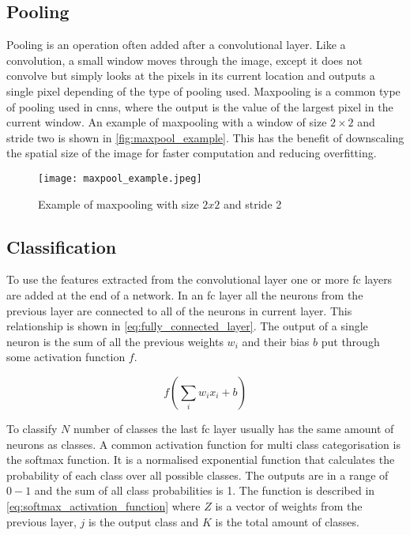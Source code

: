 \subsection{Pooling}
Pooling is an operation often added after a convolutional layer. Like a convolution, a small window moves through the image, except it does not convolve but simply looks at the pixels in its current location and outputs a single pixel depending of the type of pooling used. Maxpooling is a common type of pooling used in \gls{cnn}s, where the output is the value of the largest pixel in the current window. An example of maxpooling with a window of size $2\times2$ and stride two is shown in \autoref{fig:maxpool_example}. This has the benefit of downscaling the spatial size of the image for faster computation and reducing overfitting.

\begin{figure}[H]
\centering
\texttt{[image: maxpool\_example.jpeg]}
\caption{Example of maxpooling with size $2x2$ and stride 2 \citep{Karpathy2016a}}
\label{fig:maxpool_example}
\end{figure}

\subsection{Classification}
To use the features extracted from the convolutional layer one or more \gls{fc} layers are added at the end of a network. In an \gls{fc} layer all the neurons from the previous layer are connected to all of the neurons in current layer. This relationship is shown in \autoref{eq:fully_connected_layer}. The output of a single neuron is the sum of all the previous weights $w_i$ and their bias $b$ put through some activation function $f$.

\begin{equation}
\label{eq:fully_connected_layer}
f\left(\sum_{i}w_{i}x_{i}+b\right)
\end{equation}

To classify $N$ number of classes the last \gls{fc} layer usually has the same amount of neurons as classes. A common activation function for multi class categorisation is the softmax function. It is a normalised exponential function that calculates the probability of each class over all possible classes. The outputs are in a range of $0 - 1$ and the sum of all class probabilities is 1. The function is described in \autoref{eq:softmax_activation_function} where $Z$ is a vector of weights from the previous layer, $j$ is the output class and $K$ is the total amount of classes.

